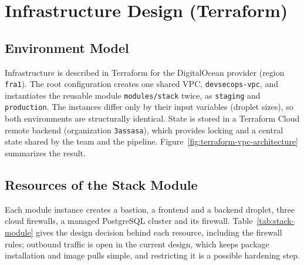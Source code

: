 \section{Infrastructure Design (Terraform)}
\label{sec:infra}

\subsection{Environment Model}

Infrastructure is described in Terraform for the DigitalOcean provider (region \texttt{fra1}). The root configuration creates one shared VPC, \texttt{devsecops-vpc}, and instantiates the reusable module \texttt{modules/stack} twice, as \texttt{staging} and \texttt{production}. The instances differ only by their input variables (droplet sizes), so both environments are structurally identical. State is stored in a Terraform Cloud remote backend (organization \texttt{3assasa}), which provides locking and a central state shared by the team and the pipeline. Figure~\ref{fig:terraform-vpc-architecture} summarizes the result.



\subsection{Resources of the Stack Module}

Each module instance creates a bastion, a frontend and a backend droplet, three cloud firewalls, a managed PostgreSQL cluster and its firewall. Table~\ref{tab:stack-module} gives the design decision behind each resource, including the firewall rules; outbound traffic is open in the current design, which keeps package installation and image pulls simple, and restricting it is a possible hardening step.

